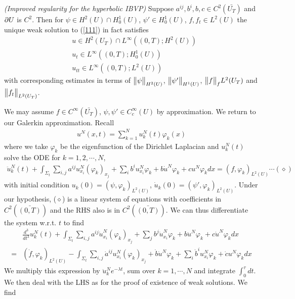 \documentclass[12pt,a4paper]{report}
\newenvironment{proof}
{\begin{changemargin}{1cm}{0.5cm} 
	}%
	{\end{changemargin}
}
\begin{document}
\thm \emph{(Improved regularity for the hyperbolic IBVP)} Suppose $a^{ij}, b^i,b,c\in C^2(\bar{U_T})$ and $\partial U$ is $C^2$. Then for $\psi\in H^2(U)\cap H_0^1(U)$, $\psi'\in H_0^1(U)$, $f,f_t\in L^2(U)$ the unique weak solution to (\ref{111}) in fact satisfies
\begin{align*}
& u\in H^2(U_T)\cap L^{\infty}((0,T); H^2(U))\\
& u_t \in L^{\infty}((0,T); H_0^1(U))\\
& u_{tt} \in L^{\infty}((0,T); L^2(U))
\end{align*} 
with corresponding estimates in terms of $\bigl\lVert\psi\bigr\rVert_{H^2(U)}$, $\bigl\lVert\psi'\bigr\rVert_{H^1(U)}$, $\bigl\lVert f\bigr\rVert_{f}{L^2(U_T)}$ and $\bigl\lVert f_t\bigr\rVert_{L^2(U_T)}$.
\begin{proof}
\pf We may assume $f\in C^{\infty}(\bar{U_T})$, $\psi, \psi'\in C_c^{\infty}(U)$ by approximation. We return to our Galerkin approximation. Recall
\begin{align*}
u^N(x,t) = \sum_{k=1}^N u_k^N(t)\varphi_k(x)
\end{align*} 
where we take $\varphi_k$ be the eigenfunction of the Dirichlet Laplacian and $u_k^N(t)$ solve the ODE for $k=1, 2, \cdots, N$, 
\begin{align*}
\ddot{u}_k^N (t) + \int_{\Sigma_t}\sum_{i,j}a^{ij}u_{x_i}^N (\varphi_k)_{x_j} + \sum_i b^i u_{x_i}^N \varphi_k + b \dot{u}^N \varphi_k + cu^N \varphi_k dx= (f, \varphi_k)_{L^2(U)} \cdots (\diamond)
\end{align*} 
with initial condition $u_k(0) = (\psi, \varphi_k)_{L^2(U)}$, $\dot{u}_k (0) = (\psi', \varphi_k)_{L^2(U)}$. Under our hypothesis, ($\diamond$) is a linear system of equations with coefficients in $C^2(\bar{(0,T)})$ and the RHS also is in $C^2(\bar{(0,T)})$. We can thus differentiate the system w.r.t. $t$ to find
\begin{align*}
&\frac{d^3}{dt^3}u_k^N(t) + \int_{\Sigma_t}\sum_{i,j}a^{ij}\dot{u}_{x_i}^N (\varphi_k)_{x_j} + \sum_j b^j \dot{u}_{x_i}^N \varphi_k + b \ddot{u}^N \varphi_k + c\dot{u}^N \varphi_k dx\\
=& (\dot{f}, \varphi_k)_{L^2(U)} - \int_{\Sigma_t}\sum_{i,j} \dot{a}^{ij} u_{x_i}^N (\varphi_k)_{x_j}+ \dot{b}\dot{u}^N \varphi_k + \sum_i \dot{b}^i u_{x_i}^N \varphi_k + \dot{c}u^N \varphi_k dx
\end{align*}
We multiply this expression by $\ddot{u}_k^N e^{-\lambda t}$, sum over $k=1, \cdots, N$ and integrate $\int_0^{\tau} dt$. We then deal with the LHS as for the proof of existence of weak solutions. We find
\begin{align*}

\end{align*}
\end{proof}
\end{document}
